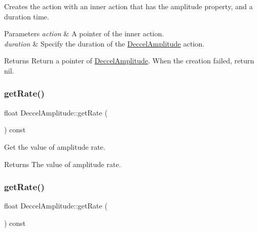 Creates the action with an inner action that has the amplitude property, and a duration time. 


\begin{DoxyParams}{Parameters}
{\em action} & A pointer of the inner action. \\
\hline
{\em duration} & Specify the duration of the \hyperlink{classDeccelAmplitude}{Deccel\+Amplitude} action. \\
\hline
\end{DoxyParams}
\begin{DoxyReturn}{Returns}
Return a pointer of \hyperlink{classDeccelAmplitude}{Deccel\+Amplitude}. When the creation failed, return nil. 
\end{DoxyReturn}
\mbox{\label{classDeccelAmplitude_ae08f5a309c66a2301ce57cb579457f10}} 
\subsubsection{\texorpdfstring{get\+Rate()}{getRate()}\hspace{0.1cm}{\footnotesize\ttfamily [1/2]}}
{\footnotesize\ttfamily float Deccel\+Amplitude\+::get\+Rate (\begin{DoxyParamCaption}{ }\end{DoxyParamCaption}) const\hspace{0.3cm}{\ttfamily [inline]}}



Get the value of amplitude rate. 

\begin{DoxyReturn}{Returns}
The value of amplitude rate. 
\end{DoxyReturn}
\mbox{\label{classDeccelAmplitude_ae08f5a309c66a2301ce57cb579457f10}} 
\subsubsection{\texorpdfstring{get\+Rate()}{getRate()}\hspace{0.1cm}{\footnotesize\ttfamily [2/2]}}
{\footnotesize\ttfamily float Deccel\+Amplitude\+::get\+Rate (\begin{DoxyParamCaption}{ }\end{DoxyParamCaption}) const\hspace{0.3cm}{\ttfamily [inline]}}



